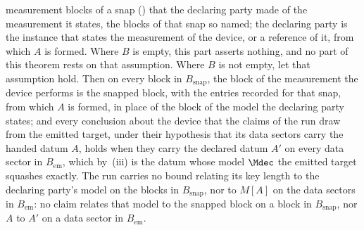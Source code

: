 \begin{theorem}
\begin{enumerate}[label=(\roman*),leftmargin=3.0em]
  measurement blocks of a snap () that the
  declaring party made of the measurement it states, the blocks of that
  snap so named; the declaring party is the instance that states the
  measurement of the device, or a reference of it, from which $A$ is formed.
  Where $B$ is empty, this part asserts nothing, and no part of this theorem
  rests on that assumption. Where $B$ is not empty, let that assumption
  hold. Then on every block in $B_{\mathrm{snap}}$, the block of the
  measurement the device performs is the snapped block, with the entries
  recorded for that snap, from which $A$ is formed, in place of the block of
  the model the declaring party states; and every conclusion about the
  device that the claims of the run draw from the emitted target, under
  their hypothesis that its data sectors carry the handed datum $A$, holds
  when they carry the declared datum $A'$ on every data sector in
  $B_{\mathrm{em}}$, which by~(iii) is the datum whose model $\Mdec$ the
  emitted target squashes exactly. The run carries no bound relating its key
  length to the declaring party's model on the blocks in
  $B_{\mathrm{snap}}$, nor to $M[A]$ on the data sectors in
  $B_{\mathrm{em}}$: no claim relates that model to the snapped block on a
  block in $B_{\mathrm{snap}}$, nor $A$ to $A'$ on a data sector in
  $B_{\mathrm{em}}$.
\end{enumerate}
\end{theorem}

